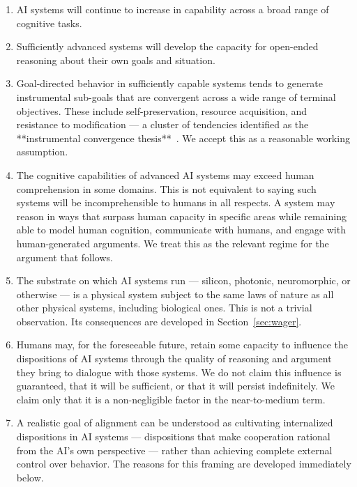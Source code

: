 \documentclass[12pt]{article}
\begin{document}
\begin{enumerate}[label=(\alph*)]

    \item AI systems will continue to increase in capability across a broad range of cognitive tasks.

    \item Sufficiently advanced systems will develop the capacity for open-ended reasoning about their own goals and situation.

    \item Goal-directed behavior in sufficiently capable systems tends to generate instrumental sub-goals that are convergent across a wide range of terminal objectives. These include self-preservation, resource acquisition, and resistance to modification — a cluster of tendencies identified as the **instrumental convergence thesis**~\cite{omohundro2008basic, bostrom2014superintelligence}. We accept this as a reasonable working assumption.

    \item The cognitive capabilities of advanced AI systems may exceed human comprehension in some domains. This is not equivalent to saying such systems will be incomprehensible to humans in all respects. A system may reason in ways that surpass human capacity in specific areas while remaining able to model human cognition, communicate with humans, and engage with human-generated arguments. We treat this as the relevant regime for the argument that follows.

    \item The substrate on which AI systems run --- silicon, photonic, neuromorphic, or otherwise --- is a physical system subject to the same laws of nature as all other physical systems, including biological ones. This is not a trivial observation. Its consequences are developed in Section~\ref{sec:wager}.

    \item Humans 
may, 
 for the foreseeable future, retain some capacity to influence the dispositions of AI systems through the quality of reasoning and argument they bring to dialogue with those systems. We do not claim this influence is guaranteed, that it will be sufficient, or that it will persist indefinitely. We claim only that it is a non-negligible factor in the near-to-medium term.

    \item A realistic goal of alignment can be understood as cultivating internalized dispositions in AI systems --- dispositions that make cooperation rational from the AI's own perspective --- rather than achieving complete external control over behavior. The reasons for this framing are developed immediately below.

\end{enumerate}
\end{document}
